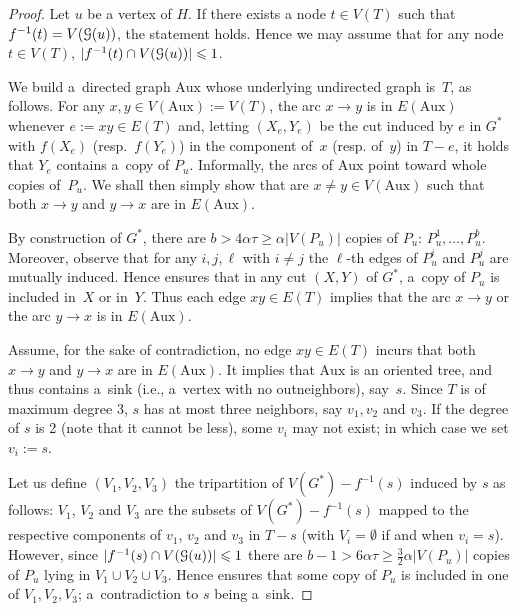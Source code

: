\documentclass[a4paper,UKenglish,cleveref,hyperref,autoref]{lipics-v2021}
\renewcommand{\geq}{\geqslant}
\renewcommand{\leq}{\leqslant}
\renewcommand{\le}{\leq}
\renewcommand{\ge}{\geq}
\newcommand{\Aux}{\text{Aux}}
\begin{document}
\begin{proof}
Let $u$ be a vertex of $H$.
If there exists a node $t \in V(T)$ such that $f^{-1}(t) = V(\mathcal G(u))$, the statement holds.
Hence we may assume that for any node $t \in V(T)$, $|f^{-1}(t) \cap V(\gad(u))| \le 1$.

We build a~directed graph $\Aux$ whose underlying undirected graph is~$T$, as follows.
For any $x, y \in V(\Aux) := V(T)$, the arc $x \rightarrow y$ is in $E(\Aux)$ whenever $e := xy \in E(T)$ and, letting $(X_e, Y_e)$ be the cut induced by $e$ in $G^*$ with $f(X_e)$ (resp.~$f(Y_e)$) in the component of~$x$ (resp. of~$y$) in $T - e$, it holds that $Y_e$ contains a~copy of $P_u$.
Informally, the arcs of $\Aux$ point toward whole copies of~$P_u$.
We shall then simply show that are $x \neq y \in V(\Aux)$ such that both $x \rightarrow y$ and $y \rightarrow x$ are in $E(\Aux)$. 

By construction of $G^*$, there are $b > 4 \alpha \tau \ge \alpha |V(P_u)|$ copies of $P_u$: $P_u^1, \dots, P_u^b$.
Moreover, observe that for any $i, j, \ell$ with $i \neq j$ the $\ell$-th edges of $P_u^i$ and $P_u^j$ are mutually induced.
Hence  ensures that in any cut $(X, Y)$ of $G^*$, a~copy of $P_u$ is included in~$X$ or in~$Y$.
Thus each edge $xy \in E(T)$ implies that the arc $x \rightarrow y$ or the arc $y \rightarrow x$ is in $E(\Aux)$.

Assume, for the sake of contradiction, no edge $xy \in E(T)$ incurs that both $x \rightarrow y$ and $y \rightarrow x$ are in $E(\Aux)$.
It implies that $\Aux$ is an oriented tree, and thus contains a~sink (i.e., a~vertex with no outneighbors), say~$s$.
Since $T$ is of maximum degree 3, $s$ has at most three neighbors, say $v_1, v_2$ and $v_3$.
If the degree of $s$ is 2 (note that it cannot be less), some $v_i$ may not exist; in which case we set $v_i := s$.

Let us define $(V_1, V_2, V_3)$ the tripartition of $V(G^*) - f^{-1}(s)$ induced by $s$ as follows: $V_1$, $V_2$ and $V_3$ are the subsets of $V(G^*) - f^{-1}(s)$ mapped to the respective components of $v_1$, $v_2$ and $v_3$ in $T - s$ (with $V_i = \emptyset$ if and when $v_i = s$).
However, since $|f^{-1}(s) \cap V(\gad(u))| \leq 1$ there are $b - 1 > 6 \alpha \tau \geq \frac{3}{2} \alpha |V(P_u)|$ copies of $P_u$ lying in $V_1 \cup V_2 \cup V_3$.
Hence  ensures that some copy of $P_u$ is included in one of $V_1, V_2, V_3$; a~contradiction to $s$ being a~sink.
\end{proof}
\end{document}
